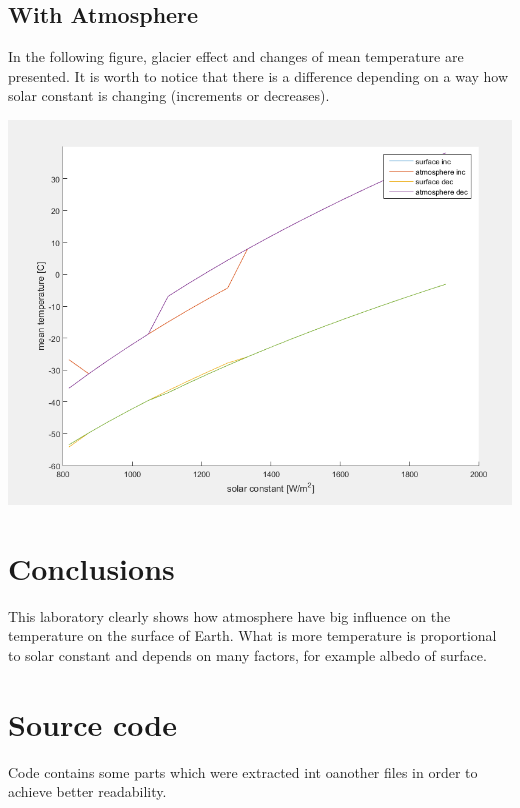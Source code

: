 \documentclass[a4paper,12pt]{article}
\begin{document}
\subsection{With Atmosphere}
In the following figure, glacier effect and changes of mean temperature are presented. It is worth to notice that there is a difference depending on a way how solar constant is changing (increments or decreases).\\
\centerline{\includegraphics[scale=0.7]{fig2}}
\section{Conclusions}
This laboratory clearly shows how atmosphere have big influence on the temperature on the surface of Earth. What is more temperature is proportional to solar constant and depends on many factors, for example albedo of surface. 
\section{Source code}
Code contains some parts which were extracted int oanother files in order to achieve better readability. \\


 
\end{document}
